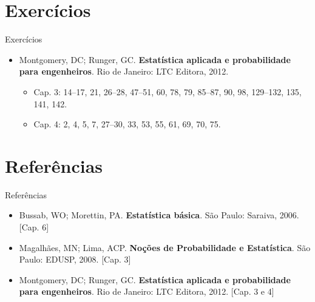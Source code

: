 \documentclass[10pt]{beamer}\usepackage[]{graphicx}\usepackage[]{color}
\theoremstyle{definition}
\begin{document}
\section{Exercícios}

\begin{frame}[fragile]{Exercícios}
  \begin{itemize}
  \item Montgomery, DC; Runger, GC. \textbf{Estatística aplicada e
      probabilidade para engenheiros}. Rio de Janeiro: LTC Editora,
    2012.
    \begin{itemize}
    \item Cap. 3: 14--17, 21, 26--28, 47--51, 60, 78, 79, 85--87, 90,
      98, 129--132, 135, 141, 142.
    \item Cap. 4: 2, 4, 5, 7, 27--30, 33, 53, 55, 61, 69, 70, 75.
    \end{itemize}
  \end{itemize}
\end{frame}

\section{Referências}

\begin{frame}{Referências}
  \begin{itemize}
  \item Bussab, WO; Morettin, PA. \textbf{Estatística básica}. São
    Paulo: Saraiva, 2006. [Cap. 6]
  \item Magalhães, MN; Lima, ACP. \textbf{Noções de Probabilidade e
      Estatística}. São Paulo: EDUSP, 2008. [Cap. 3]
  \item Montgomery, DC; Runger, GC. \textbf{Estatística aplicada e
      probabilidade para engenheiros}. Rio de Janeiro: LTC Editora,
    2012. [Cap. 3 e 4]
  \end{itemize}
\end{frame}
\end{document}
